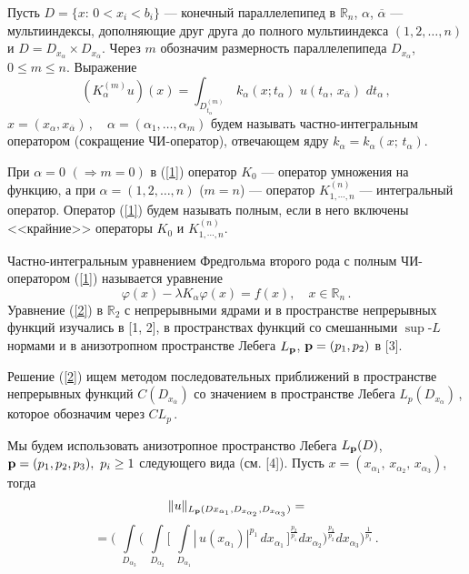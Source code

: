 \documentclass{vzmsthesis}
\begin{document}

\vzmscaption

Пусть $D=\{x:\,0<x_i<b_i\}$ --- конечный параллелепипед в $\mathbb{R}_n$, $\alpha$, ${\overline\alpha}$ --- мультииндексы, дополняющие друг друга до полного мультииндекса $(1,2,\ldots,n)$ и $D=D_{x_\alpha}\times D_{x_{\overline\alpha}}$. Через $m$ обозначим размерность 
параллелепипеда $D_{x_\alpha}$, $0\leq m\leq n$. Выражение
\begin{equation}\label{1} 
(K^{(m)}_{\alpha} u)(x)=\int_{D^{(m)}_{t_\alpha}} \,k_{\alpha}(x;t_\alpha) \,\,u(t_\alpha,
\,x_{\overline{\alpha}})\,\,dt_\alpha\,,
\end{equation}
$
x=(x_\alpha,x_{\overline\alpha})\,,\quad
\alpha=(\alpha_1,\ldots,\alpha_m)$
будем называть частно-интегральным оператором (сокращение ЧИ-оператор), отвечающем ядру $k_{\alpha}=k_{\alpha}(x;\, t_\alpha)$.

При $\alpha=0$ $(\Rightarrow m=0)$ в (\ref{1}) оператор $K_0$ --- оператор умножения на функцию, а при $\alpha=(1,2,\ldots,n)$ ($m=n$) --- оператор $K_{1,\cdots,n}^{(n)}$ --- интегральный оператор.
Оператор (\ref{1}) будем называть полным, если в него включены <<крайние>> операторы $K_0$ и $K_{1,\cdots,n}^{(n)}$.

Частно-интегральным уравнением Фредгольма второго рода с полным ЧИ-оператором (\ref{1}) называется уравнение
 \begin{equation}\label{2}
\varphi(x)-\lambda K_{\alpha}\varphi(x)=f(x), \quad x\in\mathbb{R}_n\,.
\end{equation} 
Уравнение (\ref{2}) в $\mathbb{R}_2$ с непрерывными ядрами и в пространстве непрерывных функций  изучались в [1, 2], в пространствах функций со смешанными $\sup$-$L$ нормами и в анизотропном пространстве Лебега $L_{\bf p}$, ${\bf p}=(p_1,p_2)$ в [3]. 

Решение (\ref{2}) ищем методом последовательных приближений в пространстве непрерывных функций  $C(D_{x_{\overline\alpha}})$ со значением в пространстве Лебега 
$ L_p(D_{x_{\alpha}})$\,, которое обозначим через $CL_p$\,. 

Мы будем использовать анизотропное пространство Лебега $L_{\bf p}(D)$, ${\bf p}=(p_1,p_2,p_3),~p_i\geq 1$ следующего вида (см. [4]). Пусть $x=(x_{\alpha_1},\,x_{\alpha_2},\,x_{\alpha_3})$, тогда    
$$
\|u\|_{L_{\bf p}(D{x_{\alpha_1},D_{x_{\alpha_2}},
D_{x_{\alpha_3}})}}=
$$
$$
=\Biggl(\,\, \int\limits_{D_{\alpha_3}} \Biggl(\,\, \int\limits_{D_{\alpha_2}}\biggl[\,\, 
\int\limits_{D_{\alpha_1}} |\,u(x_{\alpha_1})|^{p_1} \,dx_{\alpha_1} \,\biggr]^\frac{p_2}{p_1} dx_{\alpha_2}\Biggr)^{\frac{p_3}{p_{2}}} dx_{\alpha_3}\Biggr)^{\frac{1}{p_3}} \,.
$$
\end{document}
